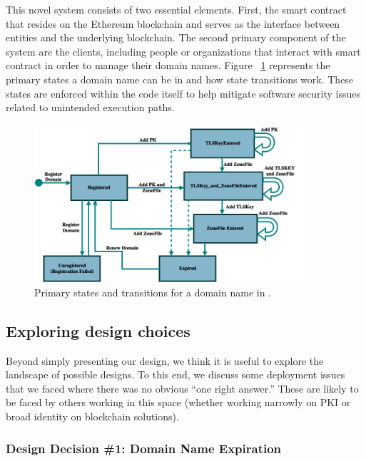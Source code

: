 This novel system consists of two essential elements. First, the smart contract that resides on the Ethereum blockchain and serves as the interface between entities and the underlying blockchain. The second primary component of the system are the clients, including people or organizations that interact with \Ghazalstar smart contract in order to manage their domain names. Figure ~\ref{fig:StateDiagram} represents the primary states a domain name can be in and how state transitions work. These states are enforced within the code itself to help mitigate software security issues related to unintended execution paths. 

\begin{figure}[htb!p]
\centering
\includegraphics[width=0.9\textwidth]{Fig/StateDiagram-2.png}
\caption{\footnotesize{Primary states and transitions for a domain name in \Ghazalstar.}}
\label{fig:StateDiagram}
\end{figure}

\subsection{Exploring \Ghazalstar design choices}

Beyond simply presenting our design, we think it is useful to explore the landscape of possible designs. To this end, we discuss some deployment issues that we faced where there was no obvious ``one right answer.'' These are likely to be faced by others working in this space (whether working narrowly on PKI or broad identity on blockchain solutions). 

\subsubsection[Domain Name Expiration]{Design Decision \#1: Domain Name Expiration}

